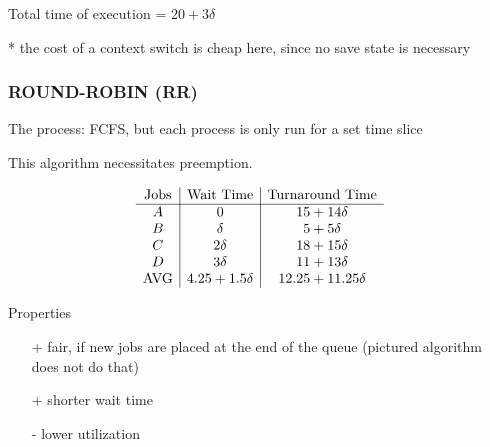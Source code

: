\documentclass[../../lecture_notes.tex]{subfiles}
\begin{document}
Total time of execution = $20 + 3\delta$

*  the cost of a context switch is cheap here, since no save state is necessary


\subsubsection*{ROUND-ROBIN (RR)}
The process: FCFS, but each process is only run for a set time slice

This algorithm necessitates preemption.

\begin{minipage}{0.5\linewidth}
\[ \begin{array}{ c | c | c }
	\text{Jobs} & \text{Wait Time} & \text{Turnaround Time} \\
	\hline
	A & 0 & 15 + 14\delta \\
	B & \delta & 5 + 5\delta \\
	C & 2\delta & 18 + 15\delta \\
	D & 3\delta & 11 + 13\delta \\
	\text{AVG} & 4.25 + 1.5\delta & 12.25 + 11.25\delta
\end{array} \]
\end{minipage}%
\begin{minipage}{0.5\linewidth}
\begin{center}
\end{center}
Properties
\begin{enumerate}[nosep]
\item[+] fair, if new jobs are placed at the end of the queue (pictured algorithm does not do that)
\item[+] shorter wait time
\item[-] lower utilization
\end{enumerate}
\end{minipage}
\end{document}
